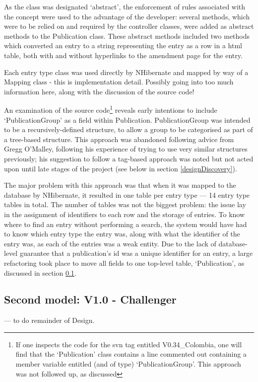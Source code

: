 As the class was designated `abstract', the enforcement of rules associated with the concept were used to the advantage of the developer: several methods, which were to be relied on and required by the controller classes, were added as abstract methods to the Publication class.  These abstract methods included two methods which converted an entry to a string representing the entry as a row in a \gls{html} table, both with and without hyperlinks to the amendment page for the entry.

Each entry type class was used directly by NHibernate and mapped by way of a Mapping class \revisit - this is implementation detail. Possibly going into too much information here, along with the discussion of the source code!

An examination of the source code\footnote{If one inspects the code for the \gls{svn} tag entitled V0.34\_Colombia, one will find that the `Publication' class contains a line commented out containing a member variable entitled (and of type) `PublicationGroup'.  This approach was not followed up, as discussed} reveals early intentions to include `PublicationGroup' as a field within Publication.  PublicationGroup was intended to be a recursively-defined structure, to allow a group to be categorised as part of a tree-based structure.  This approach was abandoned following advice from Gregg O'Malley, following his experience of trying to use very similar structures previously; his suggestion to follow a tag-based approach was noted but not acted upon until late stages of the project (see below in section \ref{designDiscovery}).

The major problem with this approach was that when it was mapped to the database by NHibernate, it resulted in one table per entry type --- 14 entry type tables in total.  The number of tables was not the biggest problem: the issue lay in the assignment of identifiers to each row and the storage of entries.  To know where to find an entry without performing a search, the system would have had to know which entry type the entry was, along with what the identifier of the entry was, as each of the entries was a weak entity.  Due to the lack of database-level guarantee that a publication's id was a unique identifier for an entry, a large refactoring took place to move all fields to one top-level table, `Publication', as discussed in section \ref{designChallenger}.

\subsection{Second model: V1.0 - Challenger}
\label{designChallenger}
\revisit --- to do remainder of Design.

